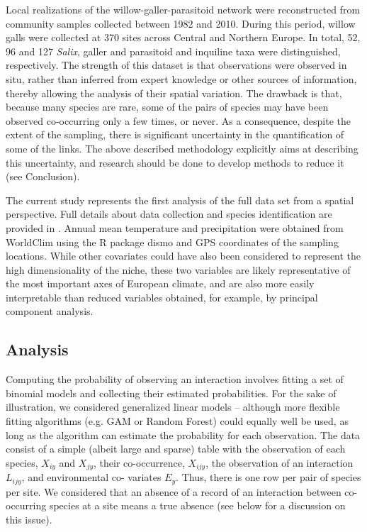 \documentclass[12pt]{article}
\begin{document}
Local realizations of the willow-galler-parasitoid network were reconstructed
from community samples collected between 1982 and 2010. During this period,
willow galls were collected at 370 sites across Central and Northern Europe.
In total, 52, 96 and 127 \textit{Salix}, galler and parasitoid and inquiline
taxa were distinguished, respectively. The strength of this dataset is that
observations were observed in situ, rather than inferred from expert knowledge
or other sources of information, thereby allowing the analysis of their
spatial variation. The drawback is that, because many species are rare, some
of the pairs of species may have been observed co-occurring only a few times,
or never. As a consequence, despite the extent of the sampling, there is
significant uncertainty in the quantification of some of the links. The above
described methodology explicitly aims at describing this uncertainty, and
research should be done to develop methods to reduce it (see Conclusion).

The current study represents the first analysis of the full data set
from a spatial perspective. Full details about data collection and species
identification are provided in \citep{Kopelke2017}. Annual mean temperature
and precipitation were obtained from WorldClim using the R package dismo
\citep{Hijmans2015} and GPS coordinates of the sampling locations. While other
covariates could have also been considered to represent the high
dimensionality of the niche, these two variables are likely representative of
the most important axes of European climate, and are also more easily
interpretable than reduced variables obtained, for example, by principal
component analysis.

\subsection*{Analysis}

Computing the probability of observing an interaction involves fitting a set
of binomial models and collecting their estimated probabilities. For the sake
of illustration, we considered generalized linear models – although more
flexible fitting algorithms (e.g. GAM or Random Forest) could equally well be
used, as long as the algorithm can estimate the probability for each
observation. The data consist of a simple (albeit large and sparse) table with
the observation of each species, $X_{iy}$ and $X_{jy}$, their co-occurrence,
$X_{ijy}$, the observation of an interaction $L_{ijy}$, and environmental co-
variates $E_y$. Thus, there is one row per pair of species per site. We
considered that an absence of a record of an interaction between co-occurring
species at a site means a true absence (see below for a discussion on this
issue).
\end{document}
